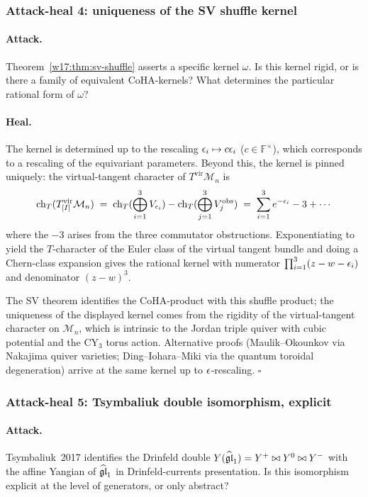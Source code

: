 \subsubsection{Attack-heal 4: uniqueness of the SV shuffle kernel}
\label{w17:subsubsec:ah4-sv-uniqueness}

\paragraph{Attack.}
Theorem~\ref{w17:thm:sv-shuffle} asserts a specific kernel $\omega$. Is this
kernel rigid, or is there a family of equivalent CoHA-kernels? What determines
the particular rational form of $\omega$?

\paragraph{Heal.}
The kernel is determined up to the rescaling $\epsilon_i \mapsto c \epsilon_i$
($c \in \mathbb{F}^\times$), which corresponds to a rescaling of the equivariant
parameters. Beyond this, the kernel is pinned uniquely: the virtual-tangent
character of $T^{\mathrm{vir}}\mathcal{M}_n$ is
\[
 \mathrm{ch}_T(T^{\mathrm{vir}}_{[I]}\mathcal{M}_n) \;=\;
 \mathrm{ch}_T(\bigoplus_{i = 1}^{3} V_{\epsilon_i}) - \mathrm{ch}_T(\bigoplus_{j = 1}^{3}
 V^{\mathrm{obs}}_j) \;=\;
 \sum_{i = 1}^{3} e^{-\epsilon_i} - 3 + \cdots
\]
where the $-3$ arises from the three commutator obstructions. Exponentiating
to yield the $T$-character of the Euler class of the virtual tangent bundle
and doing a Chern-class expansion gives the rational kernel with numerator
$\prod_{i = 1}^{3}(z - w - \epsilon_i)$ and denominator $(z - w)^3$.

The SV theorem identifies the CoHA-product with this shuffle product; the
uniqueness of the displayed kernel comes from the rigidity of the virtual-tangent
character on $\mathcal{M}_n$, which is intrinsic to the Jordan triple quiver
with cubic potential and the CY$_3$ torus action. Alternative proofs
(Maulik--Okounkov via Nakajima quiver varieties; Ding--Iohara--Miki via the
quantum toroidal degeneration) arrive at the same kernel up to
$\epsilon$-rescaling.
\hfill$\square$

\subsubsection{Attack-heal 5: Tsymbaliuk double isomorphism, explicit}
\label{w17:subsubsec:ah5-tsymbaliuk-explicit}

\paragraph{Attack.}
Tsymbaliuk~2017 identifies the Drinfeld double $Y(\widehat{\mathfrak{gl}}_1) = Y^+ \bowtie Y^0
\bowtie Y^-$ with the affine Yangian of $\widehat{\mathfrak{gl}}_1$ in Drinfeld-currents
presentation. Is this isomorphism explicit at the level of generators, or
only abstract?

